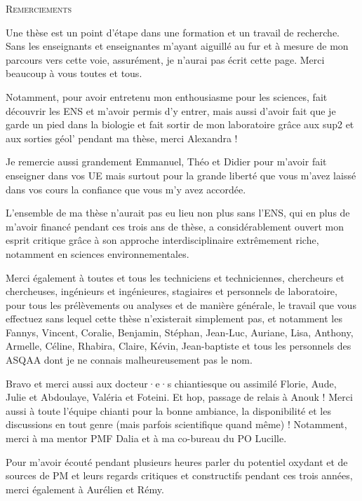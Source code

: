 \begin{center}
    \Huge\textsc{Remerciements}
\end{center}

Une thèse est un point d'étape dans une formation et un travail de recherche.
Sans les enseignants et enseignantes m'ayant aiguillé au fur et à mesure de mon parcours
vers cette voie, assurément, je n'aurai pas écrit cette page. Merci beaucoup à vous
toutes et tous.

Notamment, pour avoir entretenu mon enthousiasme pour les sciences, fait découvrir les ENS
et m'avoir permis d'y entrer, mais aussi d'avoir fait que je garde un pied dans la
biologie et fait sortir de mon laboratoire grâce aux sup2 et aux sorties géol' pendant
ma thèse, merci Alexandra !

Je remercie aussi grandement Emmanuel, Théo et Didier pour m'avoir fait enseigner
dans vos UE mais surtout pour la grande liberté que vous m'avez laissé dans vos cours la
confiance que vous m'y avez accordée.

L'ensemble de ma thèse n'aurait pas eu lieu non plus sans l'ENS, qui en plus de m'avoir
financé pendant ces trois ans de thèse, a considérablement ouvert mon esprit critique
grâce à son approche interdisciplinaire extrêmement riche, notamment en sciences
environnementales.

Merci également à toutes et tous les techniciens et techniciennes, chercheurs et
chercheuses, ingénieurs et ingénieures, stagiaires et personnels de laboratoire, pour
tous les prélèvements ou analyses et de
manière générale, le travail que vous effectuez sans lequel cette thèse n'existerait
simplement pas, et notamment les Fannys, Vincent, Coralie, Benjamin, Stéphan, Jean-Luc,
Auriane, Lisa, Anthony, Armelle, Céline, Rhabira, Claire, Kévin, Jean-baptiste et tous
les personnels des ASQAA dont je ne connais malheureusement pas le nom.

Bravo et merci aussi aux docteur·e·s chiantiesque ou assimilé Florie, Aude, Julie et
Abdoulaye, Valéria et Foteini. Et hop, passage de relais à Anouk !
Merci aussi à toute l'équipe chianti pour la bonne ambiance, la disponibilité et
les discussions en tout genre (mais parfois scientifique quand même) !
Notamment, merci à ma mentor PMF Dalia et à ma co-bureau du PO Lucille.

Pour m'avoir écouté pendant plusieurs heures parler du potentiel oxydant et de sources
de PM et leurs regards critiques et constructifs pendant ces trois années, merci
également à Aurélien et Rémy.

